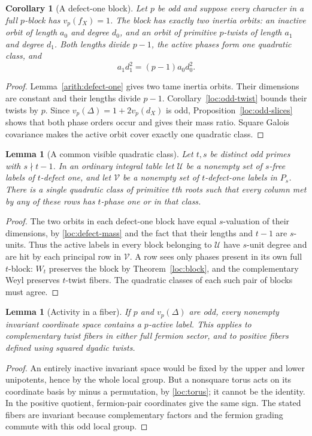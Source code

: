 \documentclass[11pt,a4paper]{article}
\numberwithin{equation}{section}
\newtheorem{lemma}[theorem]{Lemma}
\newtheorem{corollary}[theorem]{Corollary}
\begin{document}
\begin{corollary}[A defect-one block]\label{loc:defect-one}
Let $p$ be odd and suppose every character in a full $p$-block
has $v_p(f_X)=1$. The block has exactly two inertia orbits: an
inactive orbit of length $a_0$ and degree $d_0$, and an orbit
of primitive $p$-twists of length $a_1$ and degree $d_1$.
Both lengths divide $p-1$, the active phases form one quadratic
class, and
\begin{equation}\label{loc:defect-mass}
                       a_1d_1^2=(p-1)a_0d_0^2.
\end{equation}
\end{corollary}
\begin{proof}
Lemma~\ref{arith:defect-one} gives two tame inertia
orbits. Their dimensions are constant and their lengths divide
$p-1$. Corollary~\ref{loc:odd-twist} bounds their twists by
$p$. Since $v_p(\Delta)=1+2v_p(d_X)$ is odd, Proposition~\ref{loc:odd-slices}
shows that both phase orders occur and gives their mass ratio.
Square Galois covariance makes the active orbit cover exactly
one quadratic class.
\end{proof}

\begin{lemma}[A common visible quadratic class]\label{loc:visible-class}
Let $t,s$ be distinct odd primes with $s\nmid t-1$. In an ordinary
integral table let $\mathcal U$ be a nonempty set of $s$-free
labels of $t$-defect one, and let $\mathcal V$ be a nonempty set
of $t$-defect-one labels in $P_s$. There is a single quadratic class of primitive $t$th roots
such that every column met by any of these rows has $t$-phase
one or in that class.
\end{lemma}
\begin{proof}
The two orbits in each defect-one block have equal $s$-valuation
of their dimensions, by \eqref{loc:defect-mass} and the fact that
their lengths and $t-1$ are $s$-units. Thus the active labels in
every block belonging to $\mathcal U$ have $s$-unit degree and
are hit by each principal row in $\mathcal V$. A row sees only
phases present in its own full $t$-block: $W_t$ preserves the
block by Theorem~\ref{loc:block}, and the complementary Weyl
preserves $t$-twist fibers.
The quadratic classes of each such pair of blocks must agree.
\end{proof}

\begin{lemma}[Activity in a fiber]\label{loc:fiber-activity}
If $p$ and $v_p(\Delta)$ are odd, every nonempty invariant
coordinate space contains a $p$-active label. This applies to
complementary twist fibers in either full fermion sector, and to
positive fibers defined using squared dyadic twists.
\end{lemma}
\begin{proof}
An entirely inactive invariant space would be fixed by the upper
and lower unipotents, hence by the whole local group. But a
nonsquare torus acts on its coordinate basis by minus a permutation,
by \eqref{loc:torus}; it cannot be the identity. In the positive
quotient, fermion-pair coordinates give the same sign. The stated
fibers are invariant because complementary factors and the fermion
grading commute with this odd local group.
\end{proof}
\end{document}
